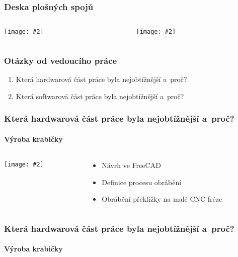 \documentclass[
    utf8,
    aspectratio=169,
    17pt,  %
]{beamer}
\newcommand{\fullsizegraphics}[2][]{%
    \centering%
    \texttt{[image: \#2]}%
}
\begin{document}
\begin{frame}
    \frametitle{Deska plošných spojů}
    \begin{columns}
        \begin{column}{0.5\textwidth}
            \fullsizegraphics{PCB-top}
        \end{column}
        \begin{column}{0.5\textwidth}
            \fullsizegraphics{PCB-bot}
        \end{column}
    \end{columns}

\end{frame}

\begin{frame}
    \frametitle{Otázky od vedoucího práce}
    \begin{enumerate}
        \item Která hardwarová část práce byla nejobtížnější a~proč?
        \item Která softwarová část práce byla nejobtížnější a~proč?
    \end{enumerate}
\end{frame}

\begin{frame}[fragile]  %
    \frametitle{Která hardwarová část práce byla nejobtížnější a~proč?}
    \framesubtitle{Výroba krabičky}
    \begin{columns}
        \begin{column}{0.5\textwidth}
            \fullsizegraphics[bb=0px 430px 2200px 1918px, clip]{final-front}
        \end{column}
        \begin{column}{0.5\textwidth}
            \begin{itemize}
                \item Návrh ve FreeCAD
                \item Definice procesu obrábění
                \item Obrábění překližky na malé CNC fréze
            \end{itemize}
        \end{column}
    \end{columns}
\end{frame}

\begin{frame}
    \frametitle{Která hardwarová část práce byla nejobtížnější a~proč?}
    \framesubtitle{Výroba krabičky}
    \only<1>{\fullsizegraphics{krabicka-CNC-repro}}
    \only<2>{\fullsizegraphics{krabicka-CNC-laser}}
    \only<3>{\fullsizegraphics{krabicka-CNC-poskozeni}}
\end{frame}
\end{document}
